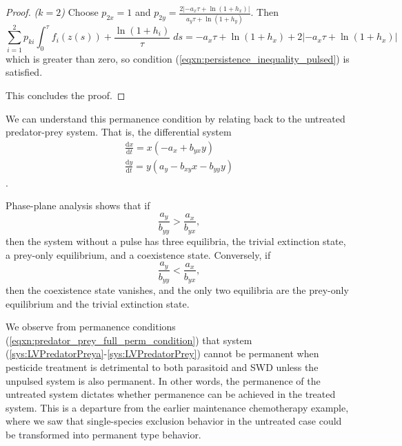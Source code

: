 \documentclass{article}
\theoremstyle{definition}
\newcommand{\rd}{\text{d}}
\begin{document}
\begin{proof}
\textit{($k = 2$)}
Choose $p_{2x} = 1$ and $p_{2y} = \frac{2|-a_x\tau + \ln{(1+h_x)}|}{a_y\tau + \ln{(1+h_y)}}$. Then
$$
\sum^2_{i=1} p_{ki} \int_0^\tau f_i(z(s)) + \frac{\ln(1+h_i)}{\tau} \; ds =
-a_x\tau + \ln{(1+h_x)} + 2|-a_x\tau + \ln{(1+h_x)}|
$$
which is greater than zero, so condition (\ref{eqxn:persistence_inequality_pulsed}) is satisfied. 

This concludes the proof. 
\end{proof}

We can understand this permanence condition by relating back to the untreated predator-prey system. That is, the differential system
\begin{equation}
\begin{split}
\frac{\rd x}{\rd t} = x\left(-a_x + b_{yx}y\right)\\
\frac{\rd y}{\rd t} = y\left(a_y - b_{xy}x - b_{yy}y\right)
\end{split}
\end{equation}.

Phase-plane analysis shows that if 
$$\frac{a_y}{b_{yy}} > \frac{a_x}{b_{yx}},$$
then the system without a pulse has three equilibria, the trivial extinction state, a prey-only equilibrium, and a coexistence state. Conversely, if 
$$\frac{a_y}{b_{yy}} < \frac{a_x}{b_{yx}},$$
then the coexistence state vanishes, and the only two equilibria are the prey-only equilibrium and the trivial extinction state. 

We observe from permanence conditions (\ref{eqxn:predator_prey_full_perm_condition}) that system (\ref{sys:LVPredatorPreya}-\ref{sys:LVPredatorPrey}) cannot be permanent when pesticide treatment is detrimental to both parasitoid and SWD unless the unpulsed system is also permanent. In other words, the permanence of the untreated system dictates whether permanence can be achieved in the treated system. This is a departure from the earlier maintenance chemotherapy example, where we saw that single-species exclusion behavior in the untreated case could be transformed into permanent type behavior.

\end{document}
